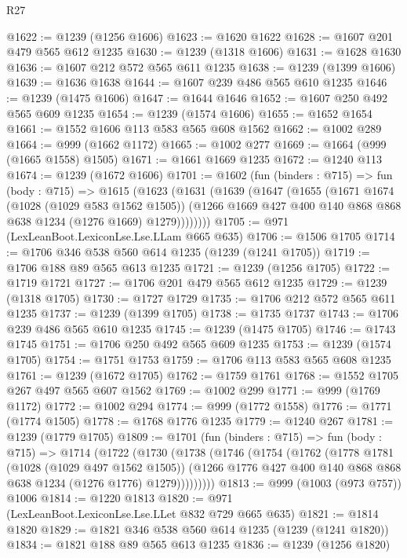 \begin{lexlean}{R27}
\begin{coremodule}
@1622 := @1239 (@1256 @1606)
@1623 := @1620 @1622
@1628 := @1607 @201 @479 @565 @612 @1235
@1630 := @1239 (@1318 @1606)
@1631 := @1628 @1630
@1636 := @1607 @212 @572 @565 @611 @1235
@1638 := @1239 (@1399 @1606)
@1639 := @1636 @1638
@1644 := @1607 @239 @486 @565 @610 @1235
@1646 := @1239 (@1475 @1606)
@1647 := @1644 @1646
@1652 := @1607 @250 @492 @565 @609 @1235
@1654 := @1239 (@1574 @1606)
@1655 := @1652 @1654
@1661 := @1552 @1606 @113 @583 @565 @608 @1562
@1662 := @1002 @289
@1664 := @999 (@1662 @1172)
@1665 := @1002 @277
@1669 := @1664 (@999 (@1665 @1558) @1505)
@1671 := @1661 @1669 @1235
@1672 := @1240 @113
@1674 := @1239 (@1672 @1606)
@1701 := @1602
    (fun (binders : @715) =>
    fun (body : @715) =>
    @1615
      (@1623
        (@1631
          (@1639
            (@1647
              (@1655
                (@1671
                  @1674
                  (@1028 (@1029 @583 @1562 @1505))
                  (@1266 @1669 @427 @400 @140 @868 @868 @638 @1234 (@1276 @1669) @1279))))))))
@1705 := @971 (LexLeanBoot.LexiconLse.Lse.LLam @665 @635)
@1706 := @1506 @1705
@1714 := @1706 @346 @538 @560 @614 @1235 (@1239 (@1241 @1705))
@1719 := @1706 @188 @89 @565 @613 @1235
@1721 := @1239 (@1256 @1705)
@1722 := @1719 @1721
@1727 := @1706 @201 @479 @565 @612 @1235
@1729 := @1239 (@1318 @1705)
@1730 := @1727 @1729
@1735 := @1706 @212 @572 @565 @611 @1235
@1737 := @1239 (@1399 @1705)
@1738 := @1735 @1737
@1743 := @1706 @239 @486 @565 @610 @1235
@1745 := @1239 (@1475 @1705)
@1746 := @1743 @1745
@1751 := @1706 @250 @492 @565 @609 @1235
@1753 := @1239 (@1574 @1705)
@1754 := @1751 @1753
@1759 := @1706 @113 @583 @565 @608 @1235
@1761 := @1239 (@1672 @1705)
@1762 := @1759 @1761
@1768 := @1552 @1705 @267 @497 @565 @607 @1562
@1769 := @1002 @299
@1771 := @999 (@1769 @1172)
@1772 := @1002 @294
@1774 := @999 (@1772 @1558)
@1776 := @1771 (@1774 @1505)
@1778 := @1768 @1776 @1235
@1779 := @1240 @267
@1781 := @1239 (@1779 @1705)
@1809 := @1701
    (fun (binders : @715) =>
    fun (body : @715) =>
    @1714
      (@1722
        (@1730
          (@1738
            (@1746
              (@1754
                (@1762
                  (@1778
                    @1781
                    (@1028 (@1029 @497 @1562 @1505))
                    (@1266 @1776 @427 @400 @140 @868 @868 @638 @1234 (@1276 @1776) @1279)))))))))
@1813 := @999 (@1003 (@973 @757)) @1006
@1814 := @1220 @1813
@1820 := @971 (LexLeanBoot.LexiconLse.Lse.LLet @832 @729 @665 @635)
@1821 := @1814 @1820
@1829 := @1821 @346 @538 @560 @614 @1235 (@1239 (@1241 @1820))
@1834 := @1821 @188 @89 @565 @613 @1235
@1836 := @1239 (@1256 @1820)

\end{coremodule}
\end{lexlean}
